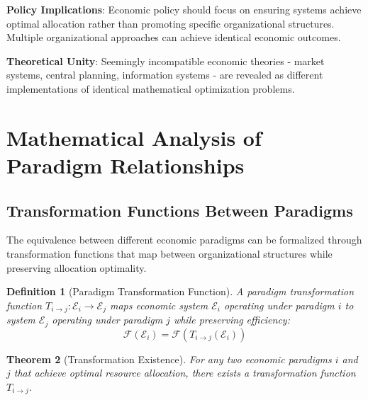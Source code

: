 \documentclass[12pt,a4paper]{article}
\newtheorem{theorem}{Theorem}
\newtheorem{definition}[theorem]{Definition}
\begin{document}
\textbf{Policy Implications}: Economic policy should focus on ensuring systems achieve optimal allocation rather than promoting specific organizational structures. Multiple organizational approaches can achieve identical economic outcomes.

\textbf{Theoretical Unity}: Seemingly incompatible economic theories - market systems, central planning, information systems - are revealed as different implementations of identical mathematical optimization problems.

\section{Mathematical Analysis of Paradigm Relationships}

\subsection{Transformation Functions Between Paradigms}

The equivalence between different economic paradigms can be formalized through transformation functions that map between organizational structures while preserving allocation optimality.

\begin{definition}[Paradigm Transformation Function]
A paradigm transformation function $T_{i \to j} : \mathcal{E}_i \to \mathcal{E}_j$ maps economic system $\mathcal{E}_i$ operating under paradigm $i$ to system $\mathcal{E}_j$ operating under paradigm $j$ while preserving efficiency:
\begin{equation}
\mathcal{F}(\mathcal{E}_i) = \mathcal{F}(T_{i \to j}(\mathcal{E}_i))
\end{equation}
\end{definition}

\begin{theorem}[Transformation Existence]
For any two economic paradigms $i$ and $j$ that achieve optimal resource allocation, there exists a transformation function $T_{i \to j}$.
\end{theorem}
\end{document}
